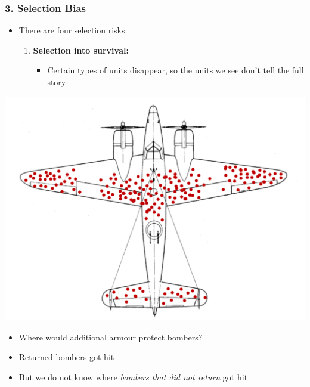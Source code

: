\documentclass[xcolor=x11names,compress]{beamer}\usepackage[]{graphicx}\usepackage[]{color}
\renewcommand{\(}{\begin{columns}}
\renewcommand{\)}{\end{columns}}
\newcommand{\<}[1]{\begin{column}{#1}}
\renewcommand{\>}{\end{column}}
\begin{document}
\begin{frame}
\frametitle{3. Selection Bias}
\begin{itemize}
\item There are four selection risks:
\begin{enumerate}
\item[2] \textbf{Selection into survival:}
\pause
\begin{itemize}
\item Certain types of units disappear, so the units we see don't tell the full story
\end{itemize}
\pause
\end{enumerate}
\end{itemize}
\begin{multicols}{2}
\includegraphics[scale=0.25]{Bombers.pdf}
\columnbreak
\begin{itemize}
\item Where would additional armour protect bombers?
\pause
\item Returned bombers got hit
\pause
\item But we do not know where \textit{bombers that did not return} got hit
\end{itemize}
\end{multicols}
\end{frame}
\end{document}
